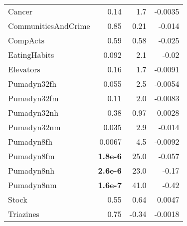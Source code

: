 \begin{tabular}{lrrr}
	Cancer              & 0.14                           & 1.7                           & -0.0035                              \\
	CommunitiesAndCrime & 0.85                           & 0.21                          & -0.014                               \\
	CompActs            & 0.59                           & 0.58                          & -0.025                               \\
	\addlinespace
	EatingHabits        & 0.092                          & 2.1                           & -0.02                                \\
	Elevators           & 0.16                           & 1.7                           & -0.0091                              \\
	Pumadyn32fh         & 0.055                          & 2.5                           & -0.0054                              \\
	Pumadyn32fm         & 0.11                           & 2.0                           & -0.0083                              \\
	Pumadyn32nh         & 0.38                           & -0.97                         & -0.0028                              \\
	\addlinespace
	Pumadyn32nm         & 0.035                          & 2.9                           & -0.014                               \\
	Pumadyn8fh          & 0.0067                         & 4.5                           & -0.0092                              \\
	Pumadyn8fm          & \textbf{1.8e-6}                & 25.0                          & -0.057                               \\
	Pumadyn8nh          & \textbf{2.6e-6}                & 23.0                          & -0.17                                \\
	Pumadyn8nm          & \textbf{1.6e-7}                & 41.0                          & -0.42                                \\
	\addlinespace
	Stock               & 0.55                           & 0.64                          & 0.0047                               \\
	Triazines           & 0.75                           & -0.34                         & -0.0018                              \\\bottomrule
\end{tabular}
